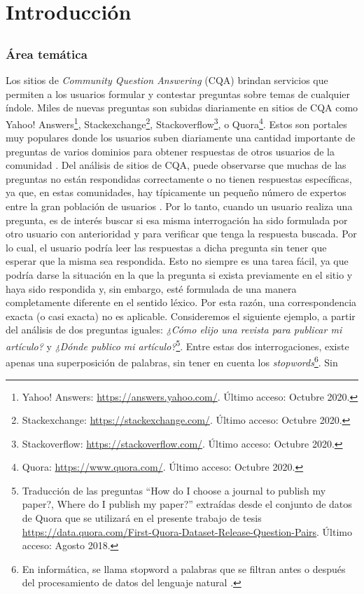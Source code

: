 \chapter*{Introducción}\label{ch:introduccion}

\section*{}
\addtocounter{section}{1}
\setcounter{subsection}{0}

\subsection{Área temática}
Los sitios de \textit{Community Question Answering} (CQA) brindan servicios que permiten a los usuarios formular y contestar preguntas sobre temas de cualquier índole. Miles de nuevas preguntas son subidas diariamente en sitios de CQA como Yahoo! Answers\footnote{Yahoo! Answers: \url{https://answers.yahoo.com/}. Último acceso: Octubre 2020.}, Stackexchange\footnote{Stackexchange: \url{https://stackexchange.com/}. Último acceso: Octubre 2020.}, Stackoverflow\footnote{Stackoverflow: \url{https://stackoverflow.com/}. Último acceso: Octubre 2020.}, o Quora\footnote{Quora: \url{https://www.quora.com/}. Último acceso: Octubre 2020.}. Estos son portales muy populares donde los usuarios suben diariamente una cantidad importante de preguntas de varios dominios para obtener respuestas de otros usuarios de la comunidad \citep{anuyah2017can}. Del análisis de sitios de CQA, puede observarse que muchas de las preguntas no están respondidas correctamente o no tienen respuestas específicas, ya que, en estas comunidades, hay típicamente un pequeño número de expertos entre la gran población de usuarios \citep{yang2013cqarank}. Por lo tanto, cuando un usuario realiza una pregunta, es de interés buscar si esa  misma interrogación ha sido formulada por otro usuario con anterioridad y para verificar que tenga la respuesta buscada. Por lo cual, el usuario podría leer las respuestas a dicha pregunta sin tener que esperar que la misma sea respondida. Esto no siempre es una tarea fácil, ya que podría darse la situación en la que la pregunta si exista previamente en el sitio y haya sido respondida y, sin embargo, esté formulada de una manera completamente diferente en el sentido léxico. Por esta razón, una correspondencia exacta (o casi exacta) no es aplicable. Consideremos el siguiente ejemplo, a partir del análisis de dos preguntas iguales: \textit{¿Cómo elijo una revista para publicar mi artículo?} y \textit{¿Dónde publico mi artículo?}\footnote{Traducción de las preguntas “How do I choose a journal to publish my paper?, Where do I publish my paper?” extraídas desde el conjunto de datos de Quora que se utilizará en el presente trabajo de tesis \url{https://data.quora.com/First-Quora-Dataset-Release-Question-Pairs}. Último acceso: Agosto 2018.}. Entre estas dos interrogaciones, existe apenas una superposición de palabras, sin tener en cuenta los \textit{stopwords}\footnote{En informática, se llama stopword a palabras que se filtran antes o después del procesamiento de datos del lenguaje natural \citep{leskovec2014mining}.}. Sin 